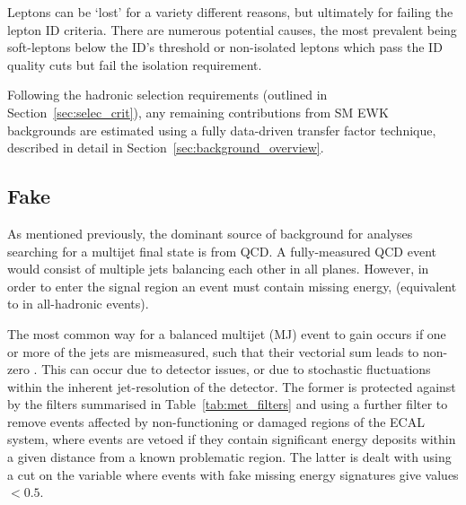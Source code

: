 Leptons can be `lost' for a variety different reasons, but ultimately for failing
the lepton ID criteria. There are numerous potential causes, the 
most prevalent being soft-leptons below the ID's \Pt threshold or non-isolated
leptons
which pass the ID quality cuts but fail the isolation requirement.




Following the hadronic selection requirements (outlined in
Section~\ref{sec:selec_crit}),
any remaining contributions from SM EWK backgrounds are estimated using a 
fully data-driven transfer factor technique, described in detail in
Section~\ref{sec:background_overview}.

\subsection{Fake \met}

As mentioned previously, the dominant source of background for analyses 
searching for a multijet final state is from QCD. A fully-measured QCD event 
would consist of multiple jets balancing each other in all planes. However, in 
order to enter the signal region an event must contain missing energy, 
\mht (equivalent to \met in all-hadronic events).

The most common way for a balanced multijet (MJ) event to gain \mht occurs if
one
or more of the jets are mismeasured, such that their vectorial sum leads to non-zero
\mht. This can occur due to detector issues, or due to stochastic fluctuations
within the inherent jet-resolution of the 
detector. The former is protected against by the \met filters summarised in 
Table~\ref{tab:met_filters} and using a further filter to remove events
affected by non-functioning or damaged regions of the ECAL system, where 
events are vetoed if they contain significant energy deposits within a given 
distance from a known problematic region. The latter is dealt with using a
cut on the \alphat variable where 
events with fake missing energy signatures give values $<0.5$.

